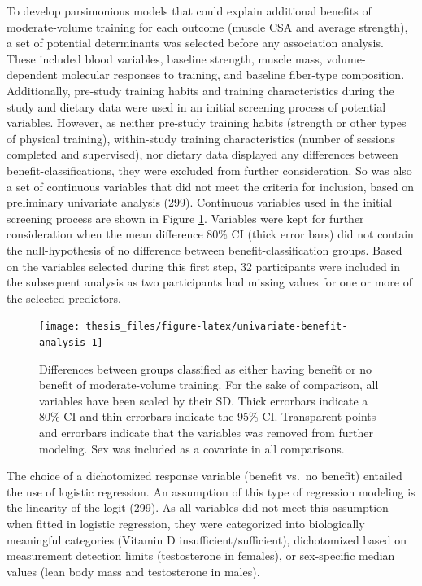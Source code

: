 \documentclass[twoside,10pt]{gihclass} %
\begin{document}
To develop parsimonious models that could explain additional benefits of moderate-volume training for each outcome (muscle CSA and average strength), a set of potential determinants was selected before any association analysis. These included blood variables, baseline strength, muscle mass, volume-dependent molecular responses to training, and baseline fiber-type composition. Additionally, pre-study training habits and training characteristics during the study and dietary data were used in an initial screening process of potential variables. However, as neither pre-study training habits (strength or other types of physical training), within-study training characteristics (number of sessions completed and supervised), nor dietary data displayed any differences between benefit-classifications, they were excluded from further consideration. So was also a set of continuous variables that did not meet the criteria for inclusion, based on preliminary univariate analysis (299).
Continuous variables used in the initial screening process are shown in Figure \ref{fig:univariate-benefit-analysis}. Variables were kept for further consideration when the mean difference 80\% CI (thick error bars) did not contain the null-hypothesis of no difference between benefit-classification groups. Based on the variables selected during this first step, 32 participants were included in the subsequent analysis as two participants had missing values for one or more of the selected predictors.
\begin{figure}

{\centering \texttt{[image: thesis\_files/figure-latex/univariate-benefit-analysis-1]} 

}

\caption[Univariate analysis of potential determinants of benefit to moderat- over low-volume training]{Differences between groups classified as either having benefit or no benefit of moderate-volume training. For the sake of comparison, all variables have been scaled by their SD. Thick errorbars indicate a 80\% CI and thin errorbars indicate the 95\% CI. Transparent points and errorbars indicate that the variables was removed from further modeling. Sex was included as a covariate in all comparisons.}\label{fig:univariate-benefit-analysis}
\end{figure}
The choice of a dichotomized response variable (benefit vs.~no benefit) entailed the use of logistic regression. An assumption of this type of regression modeling is the linearity of the logit
(299).
As all variables did not meet this assumption when fitted in logistic regression, they were categorized into biologically meaningful categories (Vitamin D insufficient/sufficient), dichotomized based on measurement detection limits (testosterone in females), or sex-specific median values (lean body mass and testosterone in males).
\end{document}
